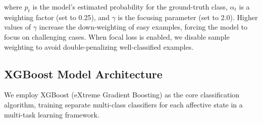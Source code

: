 \documentclass[11pt,a4paper]{article}
\begin{document}
where $p_t$ is the model's estimated probability for the ground-truth class, $\alpha_t$ is a weighting factor (set to 0.25), and $\gamma$ is the focusing parameter (set to 2.0). Higher values of $\gamma$ increase the down-weighting of easy examples, forcing the model to focus on challenging cases. When focal loss is enabled, we disable sample weighting to avoid double-penalizing well-classified examples.

\subsection{XGBoost Model Architecture}

We employ XGBoost (eXtreme Gradient Boosting) as the core classification algorithm, training separate multi-class classifiers for each affective state in a multi-task learning framework.
\end{document}
